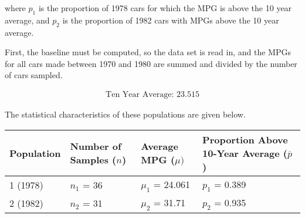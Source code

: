 \documentclass[twocolumn,english]{IEEEtran}
\theoremstyle{plain}
\theoremstyle{plain}
\begin{document}
where $p_1$ is the proportion of 1978 cars for which the MPG is above the 10 year average, and $p_2$ is the proportion of 1982 cars with MPGs above the 10 year average.

First, the baseline must be computed, so the data set is read in, and the MPGs for all cars made between 1970 and 1980 are summed and divided by the number of cars sampled.

\begin{align*}
\text{Ten Year Average: 23.515}
\end{align*}

The statistical characteristics of these populations are given below.


\begin{table}[h]
\centering
		\begin{tabular}{@{}llll@{}}
		\toprule
		Population 	&Number of Samples ($n$)	 					&Average MPG ($\mu)	$ 			&Proportion Above 10-Year Average ($\overline{p}$) 	\\ \midrule
		1 (1978)    &$n_1$ = 36    	&$\mu_1$ = 24.061 	&$p_1$ = 0.389    																	\\
		2 (1982)  	&$n_2$ = 31    	&$\mu_2$ = 31.71 	&$p_2$ = 0.935  																		\\ \bottomrule
		\end{tabular}
\end{table}

%
%
\end{document}
